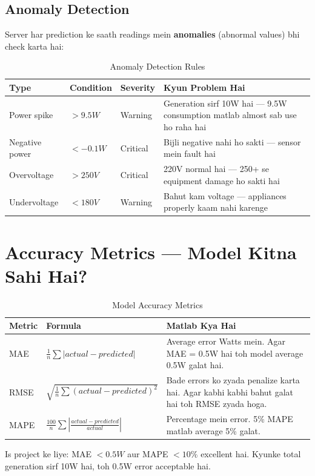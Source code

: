 \subsection{Anomaly Detection}

Server har prediction ke saath readings mein \textbf{anomalies} (abnormal values) bhi check karta hai:

\begin{table}[H]
\centering
\begin{tabularx}{\textwidth}{l l l X}
\toprule
\textbf{Type} & \textbf{Condition} & \textbf{Severity} & \textbf{Kyun Problem Hai} \\
\midrule
Power spike & $> 9.5W$ & Warning & Generation sirf 10W hai --- 9.5W consumption matlab almost sab use ho raha hai \\
Negative power & $< -0.1W$ & Critical & Bijli negative nahi ho sakti --- sensor mein fault hai \\
Overvoltage & $> 250V$ & Critical & 220V normal hai --- 250+ se equipment damage ho sakti hai \\
Undervoltage & $< 180V$ & Warning & Bahut kam voltage --- appliances properly kaam nahi karenge \\
\bottomrule
\end{tabularx}
\caption{Anomaly Detection Rules}
\end{table}

\section{Accuracy Metrics --- Model Kitna Sahi Hai?}

\begin{table}[H]
\centering
\begin{tabularx}{\textwidth}{l l X}
\toprule
\textbf{Metric} & \textbf{Formula} & \textbf{Matlab Kya Hai} \\
\midrule
MAE & $\frac{1}{n}\sum|actual - predicted|$ & Average error Watts mein. Agar MAE = 0.5W hai toh model average 0.5W galat hai. \\
RMSE & $\sqrt{\frac{1}{n}\sum(actual - predicted)^2}$ & Bade errors ko zyada penalize karta hai. Agar kabhi kabhi bahut galat hai toh RMSE zyada hoga. \\
MAPE & $\frac{100}{n}\sum\left|\frac{actual - predicted}{actual}\right|$ & Percentage mein error. 5\% MAPE matlab average 5\% galat. \\
\bottomrule
\end{tabularx}
\caption{Model Accuracy Metrics}
\end{table}

\begin{tipbox}
Is project ke liye: MAE $< 0.5W$ aur MAPE $< 10\%$ excellent hai. Kyunke total generation sirf 10W hai, toh 0.5W error acceptable hai.
\end{tipbox}
